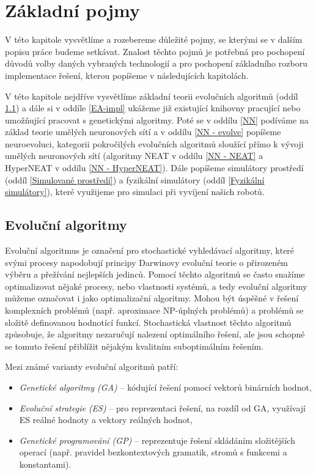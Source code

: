 \chapter{Základní pojmy} \label{chapter-zakladní pojmy}

V této kapitole vysvětlíme a rozebereme důležité pojmy, se kterými se v dalším
popisu práce budeme setkávat. Znalost těchto pojmů je potřebná pro pochopení
důvodů volby daných vybraných technologií a pro pochopení základního rozboru
implementace řešení, kterou popíšeme v následujících kapitolách.

V této kapitole nejdříve vysvětlíme základní teorii evolučních algoritmů (oddíl
\ref{Evoluční algoritmy}) a dále si v oddíle \ref{EA-impl} ukážeme již
existující knihovny pracující nebo umožňující pracovat s genetickými algoritmy.
Poté se v oddílu \ref{NN} podíváme na základ teorie umělých neuronových sítí a
v oddílu \ref{NN - evolve} popíšeme neuroevoluci, kategorii pokročilých
evolučních algoritmů sloužící přímo k vývoji umělých neuronových sítí
(algoritmy NEAT v oddílu \ref{NN - NEAT} a HyperNEAT v oddílu \ref{NN -
HyperNEAT}). Dále popíšeme simulátory prostředí (oddíl \ref{Simulované
prostředí}) a fyzikální simulátory (oddíl \ref{Fyzikální simulátory}), které
využijeme pro simulaci při vyvíjení našich robotů.

\section{Evoluční algoritmy} \label{Evoluční algoritmy}

Evoluční algoritmus je označení pro stochastické vyhledávací algoritmy, které
svými procesy napodobují principy Darwinovy evoluční teorie o přirozeném výběru
a přežívání nejlepších jedinců. Pomocí těchto algoritmů se často snažíme
optimalizovat nějaké procesy, nebo vlastnosti systémů, a tedy evoluční
algoritmy můžeme označovat i jako optimalizační algoritmy. Mohou být úspěšné v
řešení komplexních problémů (např. aproximace NP-úplných problémů) a problémů
se složitě definovanou hodnotící funkcí. Stochastická vlastnost těchto
algoritmů způsobuje, že algoritmy nezaručují nalezení optimálního řešení, ale
jsou schopné se tomuto řešení přiblížit nějakým kvalitním suboptimálním
řešením.

Mezi známé varianty evoluční algoritmů patří:
\begin{itemize}
    \item \emph{Genetické algoritmy (GA)} -- kódující řešení pomocí vektorů binárních
        hodnot,
    \item \emph{Evoluční strategie (ES)} -- pro reprezentaci řešení, na rozdíl
        od GA, využívají ES reálné hodnoty a vektory reálných hodnot, 
    \item \emph{Genetické programování (GP)} -- reprezentuje řešení skládáním
        složitějších operací (např. pravidel bezkontextových gramatik, stromů s
        funkcemi a konstantami).
\end{itemize}

